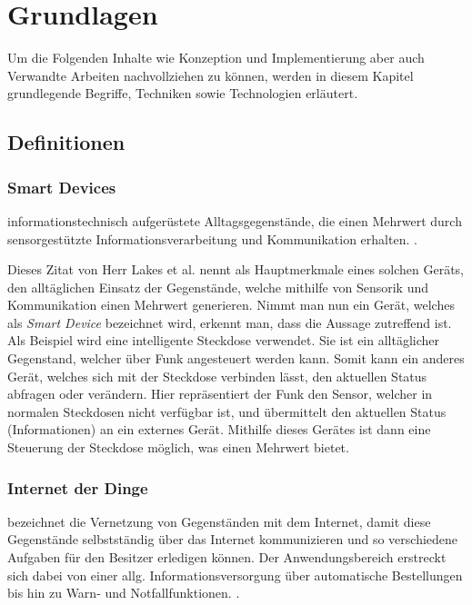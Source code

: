 \chapter{Grundlagen}
Um die Folgenden Inhalte wie Konzeption und Implementierung aber auch Verwandte Arbeiten nachvollziehen zu können, werden in diesem Kapitel grundlegende Begriffe, Techniken sowie Technologien erläutert.

\section{Definitionen}
    \subsection{Smart Devices} \label{SmartDevices}
    \glqq informationstechnisch aufgerüstete Alltagsgegenstände, die einen Mehrwert durch sensorgestützte Informationsverarbeitung und Kommunikation erhalten.\grqq{} \cite{lackes_siepermann_2018}.
    
    Dieses Zitat von Herr Lakes et al. nennt als Hauptmerkmale eines solchen Geräts, den alltäglichen Einsatz der Gegenstände, welche mithilfe von Sensorik und Kommunikation einen Mehrwert generieren.
    Nimmt man nun ein Gerät, welches als \emph{Smart Device} bezeichnet wird, erkennt man, dass die Aussage zutreffend ist. Als Beispiel wird eine intelligente Steckdose verwendet. Sie ist ein alltäglicher Gegenstand, welcher über Funk angesteuert werden kann. Somit kann ein anderes Gerät, welches sich mit der Steckdose verbinden lässt, den aktuellen Status abfragen oder verändern.
    Hier repräsentiert der Funk den Sensor, welcher in normalen Steckdosen nicht verfügbar ist, und übermittelt den aktuellen Status (Informationen) an ein externes Gerät. Mithilfe dieses Gerätes ist dann eine Steuerung der Steckdose möglich, was einen Mehrwert bietet.
    
    \subsection{Internet der Dinge}
    \glqq bezeichnet die Vernetzung von Gegenständen mit dem Internet, damit diese Gegenstände selbstständig über das Internet kommunizieren und so verschiedene Aufgaben für den Besitzer erledigen können. Der Anwendungsbereich erstreckt sich dabei von einer allg. Informationsversorgung über automatische Bestellungen bis hin zu Warn- und Notfallfunktionen.\grqq{}
    \cite{lackes_siepermann_2018_iot}.

